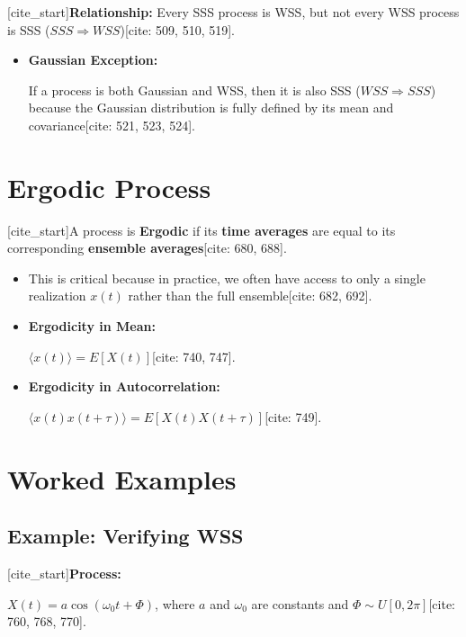 \documentclass{article}
\begin{document}
[cite\_start]\textbf{Relationship:} Every SSS process is WSS, but not every WSS process is SSS ($SSS \Rightarrow WSS$)[cite: 509, 510, 519].

\begin{itemize}

\item [cite\_start]\textbf{Gaussian Exception:}

If a process is both Gaussian and WSS, then it is also SSS ($WSS \Rightarrow SSS$) because the Gaussian distribution is fully defined by its mean and covariance[cite: 521, 523, 524].

\end{itemize}

\section{Ergodic Process}

[cite\_start]A process is \textbf{Ergodic} if its \textbf{time averages} are equal to its corresponding \textbf{ensemble averages}[cite: 680, 688].

\begin{itemize}

\item [cite\_start]This is critical because in practice, we often have access to only a single realization $x(t)$ rather than the full ensemble[cite: 682, 692].

\item [cite\_start]\textbf{Ergodicity in Mean:}

$\langle x(t) \rangle = E[X(t)]$[cite: 740, 747].

\item [cite\_start]\textbf{Ergodicity in Autocorrelation:}

$\langle x(t)x(t+\tau) \rangle = E[X(t)X(t+\tau)]$[cite: 749].

\end{itemize}

\section{Worked Examples}

\subsection{Example: Verifying WSS}

[cite\_start]\textbf{Process:}

$X(t) = a \cos(\omega_0 t + \Phi)$, where $a$ and $\omega_0$ are constants and $\Phi \sim U[0, 2\pi]$[cite: 760, 768, 770].
\end{document}
